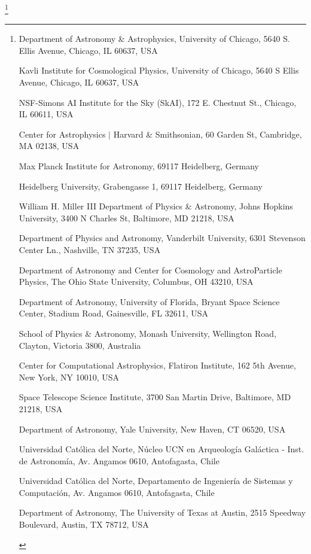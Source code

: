 \documentclass{natureprintstyle}
\begin{document}
\let\thefootnote\relax\footnote{

\begin{affiliations}
\item Department of Astronomy \& Astrophysics, University of Chicago, 5640 S. Ellis Avenue, Chicago, IL 60637, USA
\item Kavli Institute for Cosmological Physics, University of Chicago, 5640 S Ellis Avenue, Chicago, IL 60637, USA
\item NSF-Simons AI Institute for the Sky (SkAI), 172 E. Chestnut St., Chicago, IL 60611, USA
\item Center for Astrophysics $|$ Harvard \& Smithsonian, 60 Garden St, Cambridge, MA 02138, USA
\item Max Planck Institute for Astronomy, 69117 Heidelberg, Germany
\item Heidelberg University, Grabengasse 1, 69117 Heidelberg, Germany
\item William H. Miller III Department of Physics \& Astronomy, Johns Hopkins University, 3400 N Charles St, Baltimore, MD 21218, USA
\item Department of Physics and Astronomy, Vanderbilt University, 6301 Stevenson Center Ln., Nashville, TN 37235, USA
\item Department of Astronomy and Center for Cosmology and AstroParticle Physics, The Ohio State University, Columbus, OH 43210, USA
\item Department of Astronomy, University of Florida, Bryant Space Science Center, Stadium Road, Gainesville, FL 32611, USA
\item School of Physics \& Astronomy, Monash University, Wellington Road, Clayton, Victoria 3800, Australia
\item Center for Computational Astrophysics, Flatiron Institute, 162 5th Avenue, New York, NY 10010, USA
\item Space Telescope Science Institute, 3700 San Martin Drive, Baltimore, MD 21218, USA
\item Department of Astronomy, Yale University, New Haven, CT 06520, USA
\item Universidad Cat\'olica del Norte, N\'ucleo UCN en Arqueolog\'ia Gal\'actica - Inst. de Astronom\'ia, Av. Angamos 0610, Antofagasta, Chile
\item Universidad Cat\'olica del Norte, Departamento de Ingenier\'ia de Sistemas y Computaci\'on, Av. Angamos 0610, Antofagasta, Chile
\item Department of Astronomy, The University of Texas at Austin, 2515 Speedway Boulevard, Austin, TX 78712, USA

\end{affiliations}}
\end{document}
